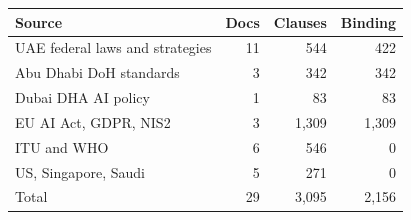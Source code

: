 \begin{tabularx}{\columnwidth}{@{}Lrrr@{}}
\toprule
\textbf{Source} & \textbf{Docs} & \textbf{Clauses} & \textbf{Binding}\\
\midrule
UAE federal laws and strategies & 11 & 544 & 422\\
Abu Dhabi DoH standards & 3 & 342 & 342\\
Dubai DHA AI policy & 1 & 83 & 83\\
EU AI Act, GDPR, NIS2 & 3 & 1,309 & 1,309\\
ITU and WHO & 6 & 546 & 0\\
US, Singapore, Saudi & 5 & 271 & 0\\
\midrule
Total & 29 & 3,095 & 2,156\\
\bottomrule
\end{tabularx}
